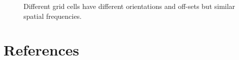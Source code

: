 \documentclass[a4paper, 12pt]{article}
\begin{document}
\begin{figure}
\hfill
{}
\hfill
{}
\hfill
\caption{Different grid cells have different orientations and off-sets but similar spatial frequencies.}
\label{diff}
\end{figure}

\section{References}
\end{document}
